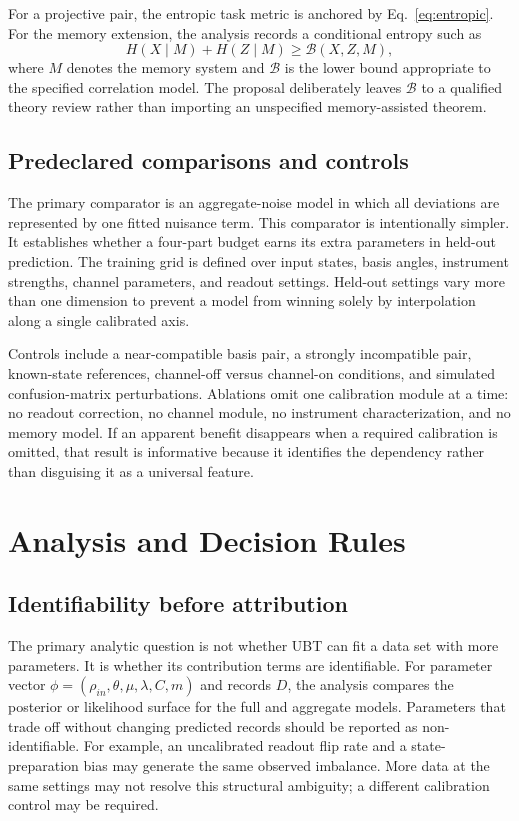 \documentclass[conference]{../../../../Conference-LaTeX-template_10-17-19/IEEEtran}
\begin{document}
For a projective pair, the entropic task metric is anchored by Eq.~\eqref{eq:entropic}. For the memory extension, the analysis records a conditional entropy such as
\begin{equation}
H(X\mid M)+H(Z\mid M) \geq \mathcal{B}(X,Z,M),
\label{eq:memory}
\end{equation}
where $M$ denotes the memory system and $\mathcal{B}$ is the lower bound appropriate to the specified correlation model. The proposal deliberately leaves $\mathcal{B}$ to a qualified theory review rather than importing an unspecified memory-assisted theorem.

\subsection{Predeclared comparisons and controls}

The primary comparator is an aggregate-noise model in which all deviations are represented by one fitted nuisance term. This comparator is intentionally simpler. It establishes whether a four-part budget earns its extra parameters in held-out prediction. The training grid is defined over input states, basis angles, instrument strengths, channel parameters, and readout settings. Held-out settings vary more than one dimension to prevent a model from winning solely by interpolation along a single calibrated axis.

Controls include a near-compatible basis pair, a strongly incompatible pair, known-state references, channel-off versus channel-on conditions, and simulated confusion-matrix perturbations. Ablations omit one calibration module at a time: no readout correction, no channel module, no instrument characterization, and no memory model. If an apparent benefit disappears when a required calibration is omitted, that result is informative because it identifies the dependency rather than disguising it as a universal feature.

\section{Analysis and Decision Rules}

\subsection{Identifiability before attribution}

The primary analytic question is not whether UBT can fit a data set with more parameters. It is whether its contribution terms are identifiable. For parameter vector $\phi=(\rho_{in},\theta,\mu,\lambda,C,m)$ and records $D$, the analysis compares the posterior or likelihood surface for the full and aggregate models. Parameters that trade off without changing predicted records should be reported as non-identifiable. For example, an uncalibrated readout flip rate and a state-preparation bias may generate the same observed imbalance. More data at the same settings may not resolve this structural ambiguity; a different calibration control may be required.
\end{document}
